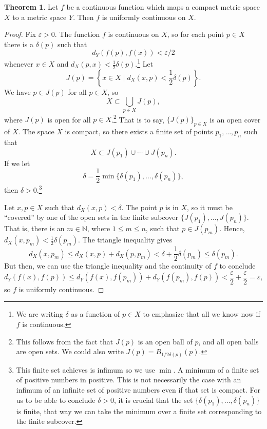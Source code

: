 \documentclass{article}
\newcommand{\N}{\mathbb{N}}
\theoremstyle{definition}
\newtheorem{theorem}{Theorem}[section]
\begin{document}
	\begin{theorem}
		Let $ f $ be a continuous function which maps a compact metric space $ X $ to a metric space $ Y $. Then $ f $ is uniformly continuous on $ X $.
	\end{theorem}
	\begin{proof}
		Fix $ \varepsilon>0 $. The function $ f $ is continuous on $ X $, so for each point $ p\in X $ there is a $ \delta(p) $ such that $$d_Y(f(p),f(x))<\varepsilon/2 $$ whenever $ x\in X $ and $ d_X(p,x)<\frac{1}{2}\delta(p) $.\footnote{We are writing $ \delta $ as a function of $ p\in X $ to emphasize that all we know now if $ f $ is continuous.} Let $$ J(p)=\left\{x\in X \mid d_X(x,p)<\frac{1}{2}\delta(p)\right\} .$$ We have $ p\in J(p) $ for all $ p\in X $, so $$X\subset\bigcup_{p\in X}J(p),$$ where $ J(p) $ is open for all $ p\in X $.\footnote{This follows from the fact that $ J(p) $ is an open ball of $ p $, and all open balls are open sets. We could also write $ J(p)=B_{1/2\delta(p)}(p) $.} That is to say, $ \{J(p)\}_{p\in X} $ is an open cover of $ X $. The space $ X $ is compact, so there exists a finite set of points $ p_1,\ldots,p_n $ such that $$ X\subset J(p_1)\cup\cdots\cup J(p_n).$$ If we let $$ \delta=\frac{1}{2}\min\{\delta(p_1),\ldots,\delta(p_n)\},$$ then $ \delta>0 $.\footnote{This finite set achieves is infimum so we use $ \min $. A minimum of a finite set of positive numbers in positive. This is not necessarily the case with an infimum of an infinite set of positive numbers even if that set is compact. For us to be able to conclude $ \delta>0 $, it is crucial that the set $ \{\delta(p_1),\ldots,\delta(p_n)\} $ is finite, that way we can take the minimum over a finite set corresponding to the finite subcover. }
		
		Let $ x,p\in X $ such that $ d_X(x,p)<\delta $. The point $ p $ is in $ X $, so it must be ``covered'' by one of the open sets in the finite subcover $ \{J(p_1),\ldots,J(p_n)\} $. That is, there is an $ m\in\N $, where $ 1\le m\le n $, such that $ p\in J(p_m) $. Hence, $d_X(x,p_m)<\frac{1}{2}\delta(p_m) $. The triangle inequality gives $$d_X(x,p_m)\le d_X(x,p)+d_X(p,p_m)<\delta+\frac{1}{2}\delta(p_m)\le\delta(p_m) .$$ But then, we can use the triangle inequality and the continuity of $ f $ to conclude $$d_Y(f(x),f(p))\le d_Y(f(x),f(p_m))+d_Y(f(p_m),f(p))<\frac{\varepsilon}{2}+\frac{\varepsilon}{2}=\varepsilon ,$$ so $ f $ is uniformly continuous.
	\end{proof}
\end{document}
